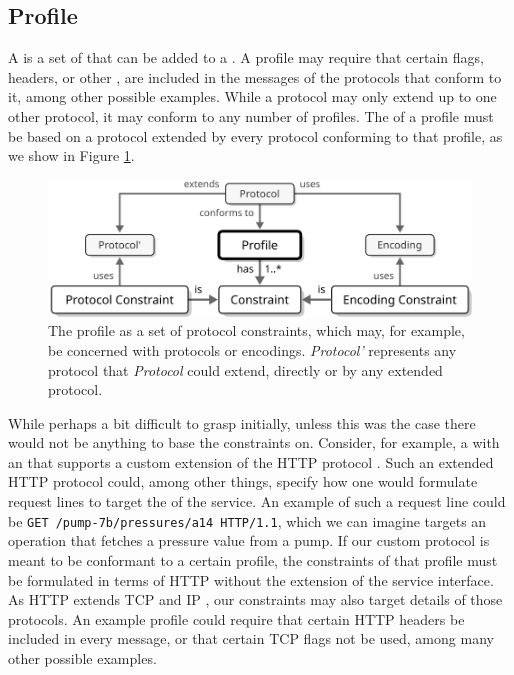 \subsection{Profile}
\label{sec:concepts:profile}

A  is a set of  that can be added to a .
A profile may require that certain flags, headers, or other , are included in the messages of the protocols that conform to it, among other possible examples.
While a protocol may only extend up to one other protocol, it may conform to any number of profiles.
The  of a profile must be based on a protocol extended by every protocol conforming to that profile, as we show in Figure \ref{fig:profile}.

\begin{figure}[ht!]
  \centering
  \includegraphics[scale=0.9]{figures/profile}
  \caption{
    The profile as a set of protocol constraints, which may, for example, be concerned with protocols or encodings.
    \textit{Protocol'} represents any protocol that \textit{Protocol} could extend, directly or by any extended protocol.
  }
  \label{fig:profile}
\end{figure}

While perhaps a bit difficult to grasp initially, unless this was the case there would not be anything to base the constraints on.
Consider, for example, a  with an  that supports a custom extension of the HTTP protocol \cite{fielding2014hypertext}.
Such an extended HTTP protocol could, among other things, specify how one would formulate request lines to target the  of the service.
An example of such a request line could be \texttt{GET /pump-7b/pressures/a14 HTTP/1.1}, which we can imagine targets an operation that fetches a pressure value from a pump.
If our custom protocol is meant to be conformant to a certain profile, the constraints of that profile must be formulated in terms of HTTP without the extension of the service interface.
As HTTP extends TCP \cite{postel1981transmission} and IP \cite{deering2017internet}, our constraints may also target details of those protocols.
An example profile could require that certain HTTP headers be included in every message, or that certain TCP flags not be used, among many other possible examples.

